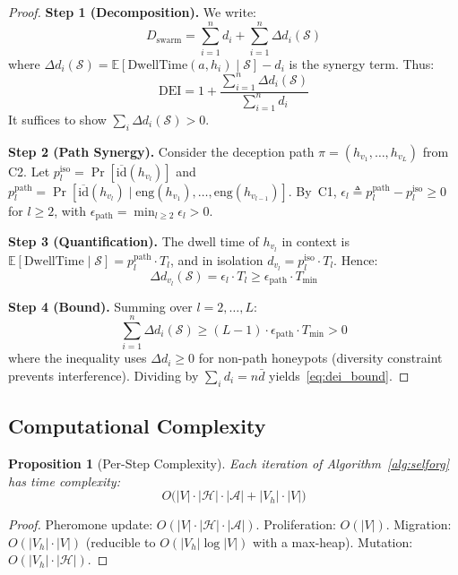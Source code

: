 \documentclass[review,3p,twocolumn]{elsarticle}
\newtheorem{proposition}[theorem]{Proposition}
\newcommand{\calA}{\mathcal{A}}
\newcommand{\calH}{\mathcal{H}}
\newcommand{\calS}{\mathcal{S}}
\newcommand{\Vh}{V_h}
\newcommand{\DEI}{\mathrm{DEI}}
\begin{document}
\begin{proof}
\textbf{Step 1 (Decomposition).} We write:
\[
D_{\mathrm{swarm}} = \sum_{i=1}^{n} d_i + \sum_{i=1}^{n} \Delta d_i(\calS)
\]
where $\Delta d_i(\calS) = \mathbb{E}[\mathrm{DwellTime}(a, h_i) \mid \calS] - d_i$ is the synergy term. Thus:
\begin{equation}
\DEI = 1 + \frac{\sum_{i=1}^{n} \Delta d_i(\calS)}{\sum_{i=1}^{n} d_i}
\end{equation}
It suffices to show $\sum_i \Delta d_i(\calS) > 0$.

\textbf{Step 2 (Path Synergy).} Consider the deception path $\pi = (h_{v_1}, \ldots, h_{v_L})$ from C2. Let $p_l^{\mathrm{iso}} = \Pr[\overline{\mathrm{id}}(h_{v_l})]$ and $p_l^{\mathrm{path}} = \Pr[\overline{\mathrm{id}}(h_{v_l}) \mid \mathrm{eng}(h_{v_1}), \ldots, \mathrm{eng}(h_{v_{l-1}})]$. By~C1, $\epsilon_l \triangleq p_l^{\mathrm{path}} - p_l^{\mathrm{iso}} \geq 0$ for $l \geq 2$, with $\epsilon_{\mathrm{path}} = \min_{l \geq 2} \epsilon_l > 0$.

\textbf{Step 3 (Quantification).} The dwell time of $h_{v_l}$ in context is $\mathbb{E}[\mathrm{DwellTime} \mid \calS] = p_l^{\mathrm{path}} \cdot T_l$, and in isolation $d_{v_l} = p_l^{\mathrm{iso}} \cdot T_l$. Hence:
\[
\Delta d_{v_l}(\calS) = \epsilon_l \cdot T_l \geq \epsilon_{\mathrm{path}} \cdot T_{\min}
\]

\textbf{Step 4 (Bound).} Summing over $l = 2, \ldots, L$:
\[
\sum_{i=1}^{n} \Delta d_i(\calS) \geq (L-1) \cdot \epsilon_{\mathrm{path}} \cdot T_{\min} > 0
\]
where the inequality uses $\Delta d_i \geq 0$ for non-path honeypots (diversity constraint prevents interference). Dividing by $\sum_i d_i = n \bar{d}$ yields~\eqref{eq:dei_bound}.
\end{proof}


\subsection{Computational Complexity}

\begin{proposition}[Per-Step Complexity]
\label{prop:complexity}
Each iteration of Algorithm~\ref{alg:selforg} has time complexity:
\begin{equation}
O\bigl(|V| \cdot |\calH| \cdot |\calA| + |\Vh| \cdot |V|\bigr)
\end{equation}
\end{proposition}

\begin{proof}
Pheromone update: $O(|V| \cdot |\calH| \cdot |\calA|)$. Proliferation: $O(|V|)$. Migration: $O(|\Vh| \cdot |V|)$ (reducible to $O(|\Vh| \log|V|)$ with a max-heap). Mutation: $O(|\Vh| \cdot |\calH|)$.
\end{proof}
\end{document}

